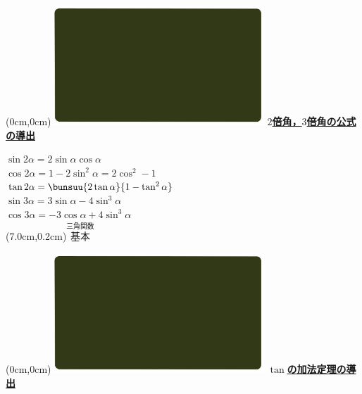 \documentclass[10pt,
fleqn,
dvipdfmx,
uplatex
]{jsarticle}
\begin{document}
\at(0cm,0cm){\includegraphics[width=8cm,bb=0 0 1920 1080]{./youtube/thumbnails/templates/smart_background/三角関数.jpeg}}
{\color{orange}\bf\boldmath\Large\underline{$2$倍角，$3$倍角の公式の導出}}\vspace{0.3zw}

\bf\boldmath 

\large
\hspace{0.5zw}$\sin 2\alpha =2\sin \alpha \cos \alpha$\\
\hspace{0.5zw}$\cos 2\alpha =1-2\sin ^2\alpha =2\cos ^2-1$\\
\hspace{0.5zw}$\tan 2\alpha =\bunsuu{{2\tan \alpha }}{{1-\tan ^2\alpha }}$\vspace{0.4zw}\\
\hspace{0.5zw}$\sin 3\alpha =3\sin \alpha -4\sin ^3\alpha$\\
\hspace{0.5zw}$\cos 3\alpha =-3\cos \alpha +4\sin ^3\alpha$\\

\at(7.0cm,0.2cm){\small\color{bradorange}$\overset{\text{三角関数}}{\text{基本}}$}


\newpage



\at(0cm,0cm){\includegraphics[width=8cm,bb=0 0 1920 1080]{./youtube/thumbnails/templates/smart_background/三角関数.jpeg}}
{\color{orange}\bf\boldmath\LARGE\underline{$\tan$の加法定理の導出}}\vspace{0.3zw}

\normalsize
\bf\boldmath
\end{document}
